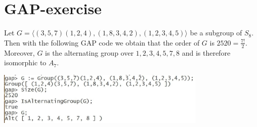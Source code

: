 \section{GAP-exercise}
Let $G = \langle (3,5,7)(1,2,4), (1,8,3,4,2), (1,2,3,4,5) \rangle$ be a subgroup of $S_8$. Then with the following GAP code we obtain that the order of $G$ is $2520 = \frac{7!}{2}$. Moreover, $G$ is the alternating group over $1,2,3,4,5,7,8$ and is therefore isomorphic to $A_7$.


\includegraphics[width=10cm]{gap_code}
